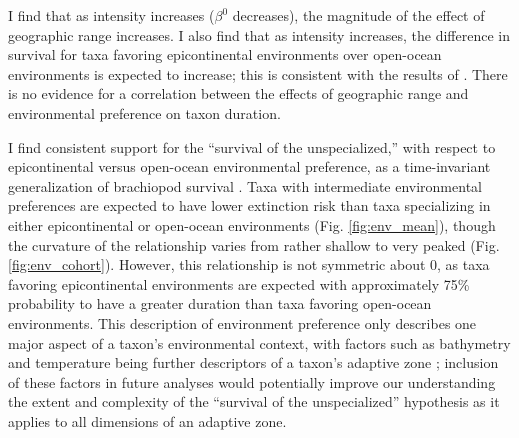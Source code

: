 \documentclass[11pt]{article}
\begin{document}
I find that as intensity increases (\(\beta^{0}\) decreases), the magnitude of the effect of geographic range increases. I also find that as intensity increases, the difference in survival for taxa favoring epicontinental environments over open-ocean environments is expected to increase; this is consistent with the results of \citet{Miller2009a}. There is no evidence for a correlation between the effects of geographic range and environmental preference on taxon duration. %


I find consistent support for the ``survival of the unspecialized,'' with respect to epicontinental versus open-ocean environmental preference, as a time-invariant generalization of brachiopod survival \citep{Simpson1944}. Taxa with intermediate environmental preferences are expected to have lower extinction risk than taxa specializing in either epicontinental or open-ocean environments (Fig. \ref{fig:env_mean}), though the curvature of the relationship varies from rather shallow to very peaked (Fig. \ref{fig:env_cohort}). However, this relationship is not symmetric about 0, as taxa favoring epicontinental environments are expected with approximately 75\% probability to have a greater duration than taxa favoring open-ocean environments. This description of environment preference only describes one major aspect of a taxon's environmental context, with factors such as bathymetry and temperature being further descriptors of a taxon's adaptive zone \citep{Nurnberg2013a,Harnik2013,Harnik2011,Heim2011}; inclusion of these factors in future analyses would potentially improve our understanding the extent and complexity of the ``survival of the unspecialized'' hypothesis as it applies to all dimensions of an adaptive zone.
\end{document}
